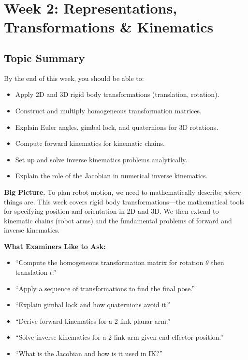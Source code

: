 \section{Week 2: Representations, Transformations \& Kinematics}

\subsection{Topic Summary}

\begin{keybox}
By the end of this week, you should be able to:
\begin{itemize}
  \item Apply 2D and 3D rigid body transformations (translation, rotation).
  \item Construct and multiply homogeneous transformation matrices.
  \item Explain Euler angles, gimbal lock, and quaternions for 3D rotations.
  \item Compute forward kinematics for kinematic chains.
  \item Set up and solve inverse kinematics problems analytically.
  \item Explain the role of the Jacobian in numerical inverse kinematics.
\end{itemize}
\end{keybox}

\textbf{Big Picture.} To plan robot motion, we need to mathematically describe \emph{where} things are. This week covers rigid body transformations---the mathematical tools for specifying position and orientation in 2D and 3D. We then extend to kinematic chains (robot arms) and the fundamental problems of forward and inverse kinematics.

\textbf{What Examiners Like to Ask:}
\begin{itemize}
  \item ``Compute the homogeneous transformation matrix for rotation $\theta$ then translation $t$.''
  \item ``Apply a sequence of transformations to find the final pose.''
  \item ``Explain gimbal lock and how quaternions avoid it.''
  \item ``Derive forward kinematics for a 2-link planar arm.''
  \item ``Solve inverse kinematics for a 2-link arm given end-effector position.''
  \item ``What is the Jacobian and how is it used in IK?''
\end{itemize}

